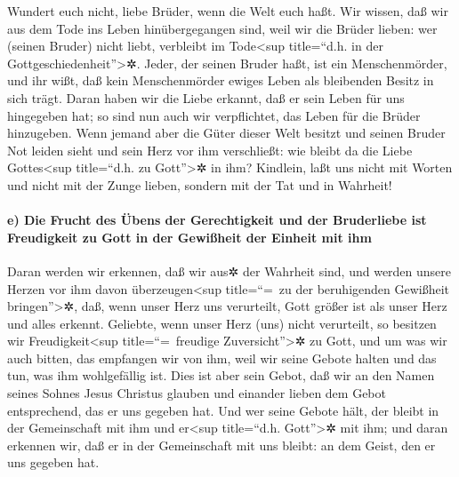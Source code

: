  Wundert euch nicht, liebe Brüder, wenn die Welt euch
haßt.  Wir wissen, daß wir aus dem Tode ins Leben
hinübergegangen sind, weil wir die Brüder lieben: wer (seinen Bruder)
nicht liebt, verbleibt im Tode\textless sup title=``d.h. in der
Gottgeschiedenheit''\textgreater✲.  Jeder, der seinen
Bruder haßt, ist ein Menschenmörder, und ihr wißt, daß kein
Menschenmörder ewiges Leben als bleibenden Besitz in sich trägt.
 Daran haben wir die Liebe erkannt, daß er sein Leben für
uns hingegeben hat; so sind nun auch wir verpflichtet, das Leben für die
Brüder hinzugeben.  Wenn jemand aber die Güter dieser
Welt besitzt und seinen Bruder Not leiden sieht und sein Herz vor ihm
verschließt: wie bleibt da die Liebe Gottes\textless sup title=``d.h. zu
Gott''\textgreater✲ in ihm?  Kindlein, laßt uns nicht mit
Worten und nicht mit der Zunge lieben, sondern mit der Tat und in
Wahrheit!

\hypertarget{e-die-frucht-des-uxfcbens-der-gerechtigkeit-und-der-bruderliebe-ist-freudigkeit-zu-gott-in-der-gewiuxdfheit-der-einheit-mit-ihm}{%
\paragraph{e) Die Frucht des Übens der Gerechtigkeit und der Bruderliebe
ist Freudigkeit zu Gott in der Gewißheit der Einheit mit
ihm}\label{e-die-frucht-des-uxfcbens-der-gerechtigkeit-und-der-bruderliebe-ist-freudigkeit-zu-gott-in-der-gewiuxdfheit-der-einheit-mit-ihm}}

 Daran werden wir erkennen, daß wir aus✲ der Wahrheit
sind, und werden unsere Herzen vor ihm davon überzeugen\textless sup
title=``=~zu der beruhigenden Gewißheit bringen''\textgreater✲,
 daß, wenn unser Herz uns verurteilt, Gott größer ist als
unser Herz und alles erkennt.  Geliebte, wenn unser Herz
(uns) nicht verurteilt, so besitzen wir Freudigkeit\textless sup
title=``=~freudige Zuversicht''\textgreater✲ zu Gott, 
und um was wir auch bitten, das empfangen wir von ihm, weil wir seine
Gebote halten und das tun, was ihm wohlgefällig ist. 
Dies ist aber sein Gebot, daß wir an den Namen seines Sohnes Jesus
Christus glauben und einander lieben dem Gebot entsprechend, das er uns
gegeben hat.  Und wer seine Gebote hält, der bleibt in
der Gemeinschaft mit ihm und er\textless sup title=``d.h.
Gott''\textgreater✲ mit ihm; und daran erkennen wir, daß er in der
Gemeinschaft mit uns bleibt: an dem Geist, den er uns gegeben hat.

